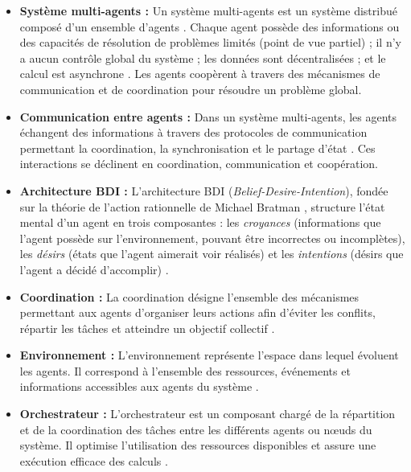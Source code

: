 \documentclass[12pt,a4paper]{report}
\begin{document}
\begin{itemize}
    \item[$\bullet$] \textbf{Système multi-agents :} Un système multi-agents est un système distribué composé d'un ensemble d'agents \cite{chapitre1}. Chaque agent possède des informations ou des capacités de résolution de problèmes limités (point de vue partiel) ; il n'y a aucun contrôle global du système ; les données sont décentralisées ; et le calcul est asynchrone \cite{chapitre1}. Les agents coopèrent à travers des mécanismes de communication et de coordination pour résoudre un problème global.

    \item[$\bullet$] \textbf{Communication entre agents :} Dans un système multi-agents, les agents échangent des informations à travers des protocoles de communication permettant la coordination, la synchronisation et le partage d'état \cite{wooldridge, chapitre1}. Ces interactions se déclinent en coordination, communication et coopération.

    \item[$\bullet$] \textbf{Architecture BDI :} L'architecture BDI (\textit{Belief-Desire-Intention}), fondée sur la théorie de l'action rationnelle de Michael Bratman \cite{chapitre2}, structure l'état mental d'un agent en trois composantes : les \textit{croyances} (informations que l'agent possède sur l'environnement, pouvant être incorrectes ou incomplètes), les \textit{désirs} (états que l'agent aimerait voir réalisés) et les \textit{intentions} (désirs que l'agent a décidé d'accomplir) \cite{chapitre2, wooldridge}.

    \item[$\bullet$] \textbf{Coordination :} La coordination désigne l'ensemble des mécanismes permettant aux agents d'organiser leurs actions afin d'éviter les conflits, répartir les tâches et atteindre un objectif collectif \cite{wooldridge, chapitre1}.

    \item[$\bullet$] \textbf{Environnement :} L'environnement représente l'espace dans lequel évoluent les agents. Il correspond à l'ensemble des ressources, événements et informations accessibles aux agents du système \cite{wooldridge}.

    \item[$\bullet$] \textbf{Orchestrateur :} L'orchestrateur est un composant chargé de la répartition et de la coordination des tâches entre les différents agents ou nœuds du système. Il optimise l'utilisation des ressources disponibles et assure une exécution efficace des calculs \cite{tanenbaum_ds, kubernetes}.


\end{itemize}
\end{document}
